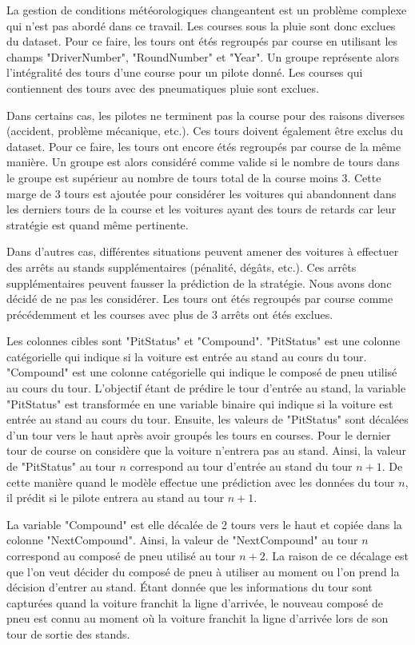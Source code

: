 La gestion de conditions météorologiques changeantent est un problème complexe qui n'est pas abordé dans ce travail.
Les courses sous la pluie sont donc exclues du dataset. Pour ce faire, les tours ont étés regroupés par course en utilisant les champs "DriverNumber", "RoundNumber" et "Year".
Un groupe représente alors l'intégralité des tours d'une course pour un pilote donné. Les courses qui contiennent des tours avec des pneumatiques pluie sont exclues.

Dans certains cas, les pilotes ne terminent pas la course pour des raisons diverses (accident, problème mécanique, etc.).
Ces tours doivent également être exclus du dataset. Pour ce faire, les tours ont encore étés regroupés par course de la même manière.
Un groupe est alors considéré comme valide si le nombre de tours dans le groupe est supérieur au nombre de tours total de la course moins 3.
Cette marge de 3 tours est ajoutée pour considérer les voitures qui abandonnent dans les derniers tours de la course et les voitures ayant des tours de retards car leur stratégie est quand même pertinente.

Dans d'autres cas, différentes situations peuvent amener des voitures à effectuer des arrêts au stands supplémentaires (pénalité, dégâts, etc.).
Ces arrêts supplémentaires peuvent fausser la prédiction de la stratégie. Nous avons donc décidé de ne pas les considérer.
Les tours ont étés regroupés par course comme précédemment et les courses avec plus de 3 arrêts ont étés exclues.

Les colonnes cibles sont "PitStatus" et "Compound". "PitStatus" est une colonne catégorielle qui indique si la voiture est entrée au stand au cours du tour.
"Compound" est une colonne catégorielle qui indique le composé de pneu utilisé au cours du tour.
L'objectif étant de prédire le tour d'entrée au stand,  la variable "PitStatus" est transformée en une variable binaire qui indique si la voiture est entrée au stand au cours du tour.
Ensuite, les valeurs de "PitStatus" sont décalées d'un tour vers le haut après avoir groupés les tours en courses. Pour le dernier tour de course on considère que la voiture n'entrera pas au stand.
Ainsi, la valeur de "PitStatus" au tour $n$ correspond au tour d'entrée au stand du tour $n+1$.
De cette manière quand le modèle effectue une prédiction avec les données du tour $n$, il prédit si le pilote entrera au stand au tour $n+1$.

La variable "Compound" est elle décalée de 2 tours vers le haut et copiée dans la colonne "NextCompound". Ainsi, la valeur de "NextCompound" au tour $n$ correspond au composé de pneu utilisé au tour $n+2$.
La raison de ce décalage est que l'on veut décider du composé de pneu à utiliser au moment ou l'on prend la décision d'entrer au stand.
Étant donnée que les informations du tour sont capturées quand la voiture franchit la ligne d'arrivée,
le nouveau composé de pneu est connu au moment où la voiture franchit la ligne d'arrivée lors de son tour de sortie des stands.

